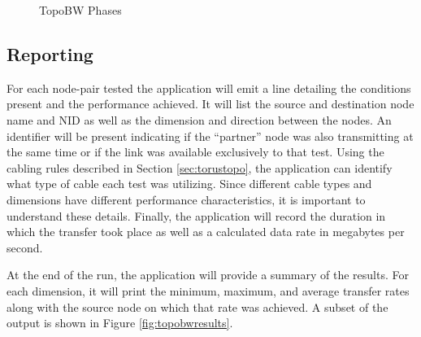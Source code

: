 \documentclass[10pt, conference, compsocconf]{IEEEtran}
\begin{document}
\begin{figure}[h]
  \caption{TopoBW Phases}\label{fig:phases}
\end{figure}

\subsection{Reporting}

For each node-pair tested the application will emit a line detailing the
conditions present and the performance achieved.  It will list the source and
destination node name and NID as well as the dimension and direction between
the nodes.  An identifier will be present indicating if the ``partner'' node
was also transmitting at the same time or if the link was available exclusively
to that test.  Using the cabling rules described in Section
\ref{sec:torustopo}, the application can identify what type of cable each test
was utilizing.  Since different cable types and dimensions have different
performance characteristics, it is important to understand these details.
Finally, the application will record the duration in which the transfer took
place as well as a calculated data rate in megabytes per second.

At the end of the run, the application will provide a summary of the results.
For each dimension, it will print the minimum, maximum, and average transfer
rates along with the source node on which that rate was achieved.  A subset of
the output is shown in Figure \ref{fig:topobwresults}.
\end{document}

